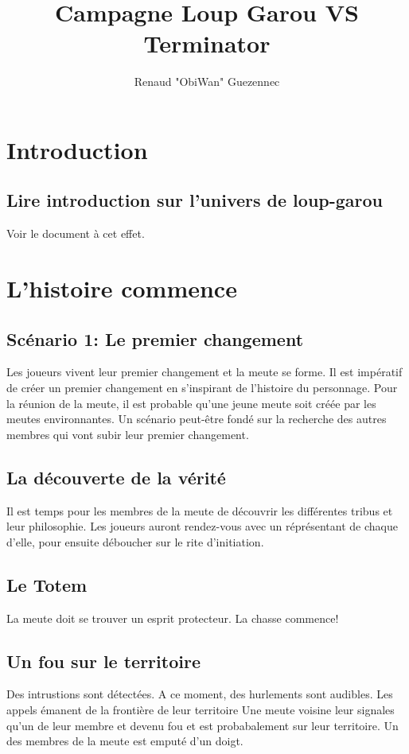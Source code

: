 \documentclass[oneside,12pt]{book}
\title{Campagne Loup Garou VS Terminator}
\author{Renaud "ObiWan" Guezennec}
\date{}
\begin{document}
\maketitle \clearpage
\tableofcontents \clearpage

\begin{flushleft}
    \chapter{Introduction}
        \section{Lire introduction sur l'univers de loup-garou}
       Voir le document à cet effet. 
       
       
\chapter{L'histoire commence}
\section{Scénario 1: Le premier changement}
Les joueurs vivent leur premier changement et la meute se forme.
Il est impératif de créer un premier changement en s'inspirant de l'histoire du personnage.
Pour la réunion de la meute, il est probable qu'une jeune meute soit créée par les meutes environnantes. 
Un scénario peut-être fondé sur la recherche des autres membres qui vont subir leur premier changement. 


\section{La découverte de la vérité}
Il est temps pour les membres de la meute de découvrir les différentes tribus et leur philosophie. 
Les joueurs auront rendez-vous avec un réprésentant de chaque d'elle, pour ensuite déboucher sur le rite d'initiation. 


\section{Le Totem}
La meute doit se trouver un esprit protecteur. La chasse commence!

\section{Un fou sur le territoire}
Des intrustions sont détectées. A ce moment, des hurlements sont audibles. Les appels émanent de la frontière de leur territoire
Une meute voisine leur signales qu'un de leur membre et devenu fou et est probabalement sur leur territoire. Un des membres
de la meute est emputé d'un doigt.


\end{flushleft}
\end{document}

